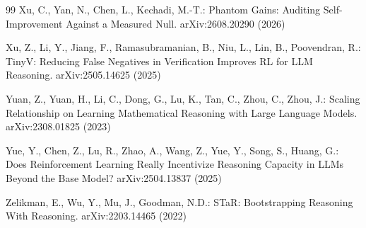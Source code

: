 \documentclass[runningheads]{llncs}
\begin{document}
\begin{thebibliography}{99}
Xu, C., Yan, N., Chen, L., Kechadi, M.-T.: Phantom Gains: Auditing
Self-Improvement Against a Measured Null. arXiv:2608.20290 (2026)

Xu, Z., Li, Y., Jiang, F., Ramasubramanian, B., Niu, L., Lin, B.,
Poovendran, R.: TinyV: Reducing False Negatives in Verification Improves RL
for LLM Reasoning. arXiv:2505.14625 (2025)

Yuan, Z., Yuan, H., Li, C., Dong, G., Lu, K., Tan, C., Zhou, C., Zhou, J.:
Scaling Relationship on Learning Mathematical Reasoning with Large Language
Models. arXiv:2308.01825 (2023)

Yue, Y., Chen, Z., Lu, R., Zhao, A., Wang, Z., Yue, Y., Song, S., Huang,
G.: Does Reinforcement Learning Really Incentivize Reasoning Capacity in
LLMs Beyond the Base Model? arXiv:2504.13837 (2025)

Zelikman, E., Wu, Y., Mu, J., Goodman, N.D.: STaR: Bootstrapping Reasoning
With Reasoning. arXiv:2203.14465 (2022)

\end{thebibliography}
\end{document}
